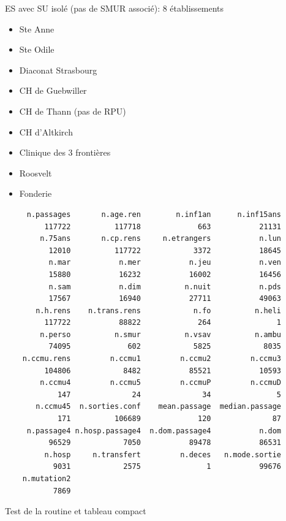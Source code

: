 \documentclass[]{article}
\begin{document}
ES avec SU isolé (pas de SMUR associé): 8 établissements

\begin{itemize}
\itemsep1pt\parskip0pt
\item
  Ste Anne
\item
  Ste Odile
\item
  Diaconat Strasbourg
\item
  CH de Guebwiller
\item
  CH de Thann (pas de RPU)
\item
  CH d'Altkirch
\item
  Clinique des 3 frontières
\item
  Roosvelt
\item
  Fonderie
\end{itemize}

\begin{verbatim}
     n.passages       n.age.ren        n.inf1an      n.inf15ans 
         117722          117718             663           21131 
        n.75ans       n.cp.rens     n.etrangers           n.lun 
          12010          117722            3372           18645 
          n.mar           n.mer           n.jeu           n.ven 
          15880           16232           16002           16456 
          n.sam           n.dim          n.nuit           n.pds 
          17567           16940           27711           49063 
       n.h.rens    n.trans.rens            n.fo          n.heli 
         117722           88822             264               1 
        n.perso          n.smur          n.vsav          n.ambu 
          74095             602            5825            8035 
    n.ccmu.rens         n.ccmu1         n.ccmu2         n.ccmu3 
         104806            8482           85521           10593 
        n.ccmu4         n.ccmu5         n.ccmuP         n.ccmuD 
            147              24              34               5 
       n.ccmu45  n.sorties.conf    mean.passage  median.passage 
            171          106689             120              87 
     n.passage4 n.hosp.passage4  n.dom.passage4           n.dom 
          96529            7050           89478           86531 
         n.hosp     n.transfert         n.deces   n.mode.sortie 
           9031            2575               1           99676 
    n.mutation2 
           7869 
\end{verbatim}

Test de la routine et tableau compact
\end{document}
